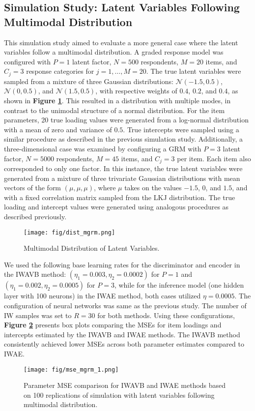 \documentclass[a4paper,12pt]{article}
\theoremstyle{plain} %
\theoremstyle{remark} %
\theoremstyle{definition} %
\begin{document}
\subsection{Simulation Study: Latent Variables Following Multimodal Distribution}
This simulation study aimed to evaluate a more general case where the latent variables follow a multimodal distribution. A graded response model was configured with $P=1$ latent factor, $N=500$ respondents, $M=20$ items, and $C_j=3$ response categories for $j=1,\dots,M=20$. The true latent variables were sampled from a mixture of three Gaussian distributions: $\mathcal{N}(-1.5, 0.5)$, $\mathcal{N}(0, 0.5)$, and $\mathcal{N}(1.5, 0.5)$, with respective weights of $0.4$, $0.2$, and $0.4$, as shown in \textbf{Figure \ref{fig:dist_mgrm}}. This resulted in a distribution with multiple modes, in contrast to the unimodal structure of a normal distribution. For the item parameters, 20 true loading values were generated from a log-normal distribution with a mean of zero and variance of $0.5$. True intercepts were sampled using a similar procedure as described in the previous simulation study. Additionally, a three-dimensional case was examined by configuring a GRM with $P=3$ latent factor, $N=5000$ respondents, $M=45$ items, and $C_j=3$ per item. Each item also corresponded to only one factor. In this instance, the true latent variables were generated from a mixture of three trivariate Gaussian distributions with mean vectors of the form $(\mu, \mu, \mu)$, where $\mu$ takes on the values $-1.5$, $0$, and $1.5$, and with a fixed correlation matrix sampled from the LKJ distribution. The true loading and intercept values were generated using analogous procedures as described previously.
\begin{figure}[htb]
\centering
\texttt{[image: fig/dist\_mgrm.png]}
\caption{Multimodal Distribution of Latent Variables.}
\label{fig:dist_mgrm}
\end{figure}

We used the following base learning rates for the discriminator and encoder in the IWAVB method: $(\eta_1=0.003,\eta_2=0.0002)$ for $P=1$ and $(\eta_1=0.002,\eta_2=0.0005)$ for $P=3$, while for the inference model (one hidden layer with 100 neurons) in the IWAE method, both cases utilized $\eta=0.0005$. The configuration of neural networks was same as the previous study. The number of IW samples was set to $R=30$ for both methods. Using these configurations, \textbf{Figure \ref{fig:mse_mgrm}} presents box plots comparing the MSEs for item loadings and intercepts estimated by the IWAVB and IWAE methods. The IWAVB method consistently achieved lower MSEs across both parameter estimates compared to IWAE.
\begin{figure}[!htb]
    \centering
    \texttt{[image: fig/mse\_mgrm\_1.png]}
    \caption{Parameter MSE comparison for IWAVB and IWAE methods based on 100 replications of simulation with latent variables following multimodal distribution.}
    \label{fig:mse_mgrm}
\end{figure}
\end{document}
